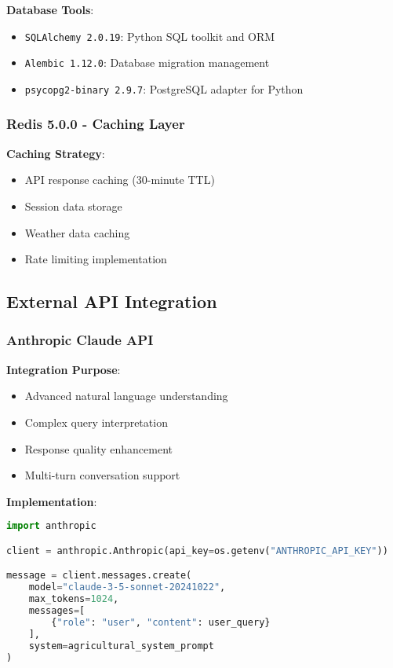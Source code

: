 \documentclass[12pt,a4paper]{article}
\begin{document}
\textbf{Database Tools}:
\begin{itemize}[leftmargin=*]
    \item \texttt{SQLAlchemy 2.0.19}: Python SQL toolkit and ORM
    \item \texttt{Alembic 1.12.0}: Database migration management
    \item \texttt{psycopg2-binary 2.9.7}: PostgreSQL adapter for Python
\end{itemize}

\subsubsection{Redis 5.0.0 - Caching Layer}

\textbf{Caching Strategy}:
\begin{itemize}[leftmargin=*]
    \item API response caching (30-minute TTL)
    \item Session data storage
    \item Weather data caching
    \item Rate limiting implementation
\end{itemize}

\subsection{External API Integration}

\subsubsection{Anthropic Claude API}

\textbf{Integration Purpose}:
\begin{itemize}[leftmargin=*]
    \item Advanced natural language understanding
    \item Complex query interpretation
    \item Response quality enhancement
    \item Multi-turn conversation support
\end{itemize}

\textbf{Implementation}:
\begin{lstlisting}[language=Python, caption=Anthropic Claude Integration]
import anthropic

client = anthropic.Anthropic(api_key=os.getenv("ANTHROPIC_API_KEY"))

message = client.messages.create(
    model="claude-3-5-sonnet-20241022",
    max_tokens=1024,
    messages=[
        {"role": "user", "content": user_query}
    ],
    system=agricultural_system_prompt
)
\end{lstlisting}
\end{document}
